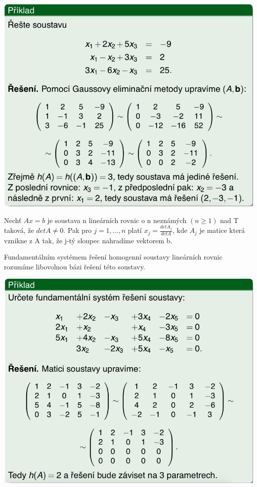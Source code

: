 \includegraphics[scale=0.5]{img/LinSoust2}

\begin{sentence}
	Nechť $Ax = b$ je soustava n lineárních rovnic o n neznámých $(n \geq 1)$ nad T taková, že $detA \not= 0$. Pak pro $j = 1, \dots,n$ platí $x_j = \frac{detA_j}{detA}$, kde $A_j$ je matice která vznikne z A tak, že j-tý sloupec nahradíme vektorem b.
\end{sentence}

\begin{definition}
	Fundamentálním systémem řešení homogenní soustavy lineárních rovnic rozumíme libovolnou bázi řešení této soustavy.
\end{definition}
\includegraphics[scale=0.5]{img/LinSoust3}

